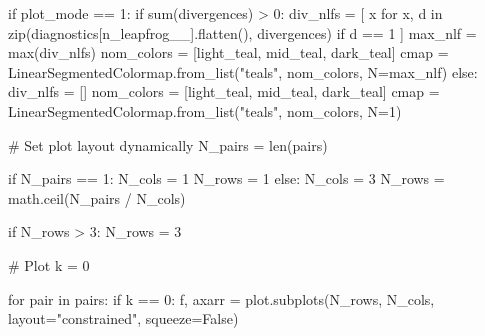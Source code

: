 \documentclass[
  letterpaper,
  DIV=11,
  numbers=noendperiod]{scrartcl}
\newenvironment{Shaded}{\begin{snugshade}}{\end{snugshade}}
\newcommand{\BuiltInTok}[1]{\textcolor[rgb]{0.00,0.23,0.31}{#1}}
\newcommand{\CommentTok}[1]{\textcolor[rgb]{0.37,0.37,0.37}{#1}}
\newcommand{\ControlFlowTok}[1]{\textcolor[rgb]{0.00,0.23,0.31}{#1}}
\newcommand{\DecValTok}[1]{\textcolor[rgb]{0.68,0.00,0.00}{#1}}
\newcommand{\KeywordTok}[1]{\textcolor[rgb]{0.00,0.23,0.31}{#1}}
\newcommand{\NormalTok}[1]{\textcolor[rgb]{0.00,0.23,0.31}{#1}}
\newcommand{\OperatorTok}[1]{\textcolor[rgb]{0.37,0.37,0.37}{#1}}
\newcommand{\StringTok}[1]{\textcolor[rgb]{0.13,0.47,0.30}{#1}}
\newcommand{\VariableTok}[1]{\textcolor[rgb]{0.07,0.07,0.07}{#1}}
\begin{document}
\begin{Shaded}
\begin{Highlighting}[]
  \ControlFlowTok{if}\NormalTok{ plot\_mode }\OperatorTok{==} \DecValTok{1}\NormalTok{:}
    \ControlFlowTok{if} \BuiltInTok{sum}\NormalTok{(divergences) }\OperatorTok{\textgreater{}} \DecValTok{0}\NormalTok{:}
\NormalTok{      div\_nlfs }\OperatorTok{=}\NormalTok{ [ x }\ControlFlowTok{for}\NormalTok{ x, d }\KeywordTok{in}
                   \BuiltInTok{zip}\NormalTok{(diagnostics[}\StringTok{\textquotesingle{}n\_leapfrog\_\_\textquotesingle{}}\NormalTok{].flatten(),}
\NormalTok{                       divergences)}
                   \ControlFlowTok{if}\NormalTok{ d }\OperatorTok{==} \DecValTok{1}\NormalTok{  ]}
\NormalTok{      max\_nlf }\OperatorTok{=} \BuiltInTok{max}\NormalTok{(div\_nlfs)}
\NormalTok{      nom\_colors }\OperatorTok{=}\NormalTok{ [light\_teal, mid\_teal, dark\_teal]}
\NormalTok{      cmap }\OperatorTok{=}\NormalTok{ LinearSegmentedColormap.from\_list(}\StringTok{"teals"}\NormalTok{, nom\_colors,}
\NormalTok{                                               N}\OperatorTok{=}\NormalTok{max\_nlf)}
    \ControlFlowTok{else}\NormalTok{:}
\NormalTok{      div\_nlfs }\OperatorTok{=}\NormalTok{ []}
\NormalTok{      nom\_colors }\OperatorTok{=}\NormalTok{ [light\_teal, mid\_teal, dark\_teal]}
\NormalTok{      cmap }\OperatorTok{=}\NormalTok{ LinearSegmentedColormap.from\_list(}\StringTok{"teals"}\NormalTok{, nom\_colors,}
\NormalTok{                                               N}\OperatorTok{=}\DecValTok{1}\NormalTok{)}
  
  \CommentTok{\# Set plot layout dynamically}
\NormalTok{  N\_pairs }\OperatorTok{=} \BuiltInTok{len}\NormalTok{(pairs)}
  
  \ControlFlowTok{if}\NormalTok{ N\_pairs }\OperatorTok{==} \DecValTok{1}\NormalTok{:}
\NormalTok{    N\_cols }\OperatorTok{=} \DecValTok{1}
\NormalTok{    N\_rows }\OperatorTok{=} \DecValTok{1}
  \ControlFlowTok{else}\NormalTok{:}
\NormalTok{    N\_cols }\OperatorTok{=} \DecValTok{3}
\NormalTok{    N\_rows }\OperatorTok{=}\NormalTok{ math.ceil(N\_pairs }\OperatorTok{/}\NormalTok{ N\_cols)}
    
  \ControlFlowTok{if}\NormalTok{ N\_rows }\OperatorTok{\textgreater{}} \DecValTok{3}\NormalTok{:}
\NormalTok{    N\_rows }\OperatorTok{=} \DecValTok{3}
    
  \CommentTok{\# Plot}
\NormalTok{  k }\OperatorTok{=} \DecValTok{0}
  
  \ControlFlowTok{for}\NormalTok{ pair }\KeywordTok{in}\NormalTok{ pairs:}
    \ControlFlowTok{if}\NormalTok{ k }\OperatorTok{==} \DecValTok{0}\NormalTok{:}
\NormalTok{      f, axarr }\OperatorTok{=}\NormalTok{ plot.subplots(N\_rows, N\_cols, layout}\OperatorTok{=}\StringTok{"constrained"}\NormalTok{,}
\NormalTok{                               squeeze}\OperatorTok{=}\VariableTok{False}\NormalTok{)}
      

\end{Highlighting}
\end{Shaded}
\end{document}
